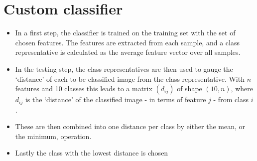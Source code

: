 \documentclass[a4paper]{scrreprt}
\newcommand{\var}[1]{\textit{#1}}
\newcommand{\op}[1]{\textsl{#1}}
\begin{document}

\section{Custom classifier}

\begin{itemize}
		\item In a first step, the classifier is trained on the training set
				with the set of chosen features. The features are extracted
				from each sample, and a class representative is calculated as
				the average feature vector over all samples.

		\item In the testing step, the class representatives are then used to
				gauge the `distance' of each to-be-classified image from the
				class representative. With $n$ features and 10 classes this
				leads to a matrix $(d_{ij})$ of shape $(10, n)$, where $d_{ij}$
				is the `distance' of the classified image - in terms of feature
				$j$ - from class $i$.

		\item These are then combined into one distance per class by either the
				mean, or the minimum, operation.

		\item Lastly the class with the lowest distance is chosen
\end{itemize}
\end{document}

